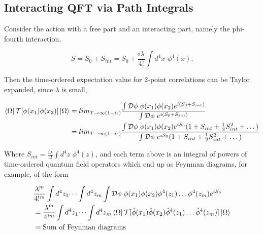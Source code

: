 \subsection*{Interacting QFT via Path Integrals}

\noindent Consider the action with a free part and an interacting part, namely the phi-fourth interaction,

\begin{equation}
S = S_0 + S_{int} = S_0 + \frac{i \lambda}{4!} \int d^4 x \,\, \phi^4 (x).
\end{equation}

\noindent Then the time-ordered expectation value for 2-point correlations can be Taylor expanded, since $\lambda$ is small,

\begin{align}
\bra{\Omega} \mathcal{T} [ \phi (x_1) \phi (x_2) ] \ket{\Omega} &= lim_{T \rightarrow \infty (1 - i \epsilon)} \frac{\int \mathcal{D} \phi \,\, \phi(x_1) \phi(x_2) e^{i (S_0 + S_{int})} }{\int \mathcal{D} \phi \,\, e^{i (S_0 + S_{int})}} \\
&= lim_{T \rightarrow \infty (1 - i \epsilon)} \frac{\int \mathcal{D} \phi \,\, \phi(x_1) \phi(x_2) e^{i S_0} (1 + S_{int} + \frac{1}{2} S_{int}^2 + \dots)}{\int \mathcal{D} \phi \,\, e^{i S_0} (1 + S_{int} + \frac{1}{2} S_{int}^2 + \dots)}
\end{align}

\noindent Where $S_{int} = \frac{i \lambda}{4!} \int d^4 z \,\, \phi^4 (z)$, and each term above is an integral of powers of time-ordered quantum field operators which end up as Feynman diagrams, for example, of the form

\begin{align}
&\frac{\lambda^m}{4!^m} \int d^4 z_1 \dots \int d^4 z_m \int \mathcal{D} \phi \,\, \phi(x_1) \phi(x_2) \phi^4(z_1) \dots \phi^4(z_m) e^{i S_0} \\
&= \frac{\lambda^m}{4!^m} \int d^4 z_1 \dots \int d^4 z_m \bra{\Omega} \mathcal{T} [\hat{\phi}(x_1) \hat{\phi}(x_2) \hat{\phi}^4 (z_1) \dots \hat{\phi}^4 (z_m) ] \ket{\Omega} \\
&= \text{Sum of Feynman diagrams}
\end{align}